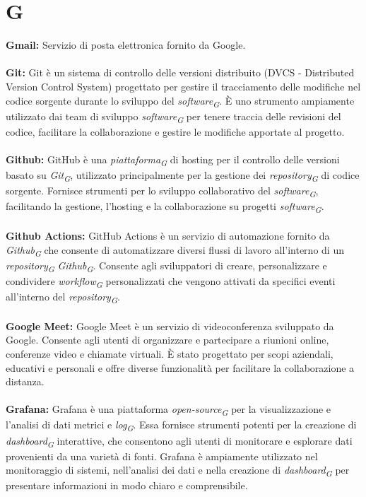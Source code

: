 \documentclass{article}
\begin{document}
\section*{G}
{}
\textbf{Gmail:} Servizio di posta elettronica fornito da Google.
\\
\\
\textbf{Git:} Git è un sistema di controllo delle versioni distribuito (DVCS - Distributed Version Control System) progettato per gestire il tracciamento delle modifiche nel codice sorgente durante lo sviluppo del \textit{software}\textsubscript{\textit{G}}. È uno strumento ampiamente utilizzato dai team di sviluppo \textit{software}\textsubscript{\textit{G}} per tenere traccia delle revisioni del codice, facilitare la collaborazione e gestire le modifiche apportate al progetto.
\\
\\
\textbf{Github:} GitHub è una \textit{piattaforma}\textsubscript{\textit{G}} di hosting per il controllo delle versioni basato su \textit{Git}\textsubscript{\textit{G}}, utilizzato principalmente per la gestione dei \textit{repository}\textsubscript{\textit{G}} di codice sorgente. Fornisce strumenti per lo sviluppo collaborativo del \textit{software}\textsubscript{\textit{G}}, facilitando la gestione, l'hosting e la collaborazione su progetti \textit{software}\textsubscript{\textit{G}}.
\\
\\
\textbf{Github Actions:} GitHub Actions è un servizio di automazione fornito da \textit{Github}\textsubscript{\textit{G}} che consente di automatizzare diversi flussi di lavoro all'interno di un \textit{repository}\textsubscript{\textit{G}} \textit{Github}\textsubscript{\textit{G}}. Consente agli sviluppatori di creare, personalizzare e condividere \textit{workflow}\textsubscript{\textit{G}} personalizzati che vengono attivati da specifici eventi all'interno del \textit{repository}\textsubscript{\textit{G}}.
\\
\\
\textbf{Google Meet:} Google Meet è un servizio di videoconferenza sviluppato da Google. Consente agli utenti di organizzare e partecipare a riunioni online, conferenze video e chiamate virtuali. È stato progettato per scopi aziendali, educativi e personali e offre diverse funzionalità per facilitare la collaborazione a distanza. 
\\
\\
\textbf{Grafana:} Grafana è una piattaforma \textit{open-source}\textsubscript{\textit{G}} per la visualizzazione e l'analisi di dati metrici e \textit{log}\textsubscript{\textit{G}}. Essa fornisce strumenti potenti per la creazione di \textit{dashboard}\textsubscript{\textit{G}} interattive, che consentono agli utenti di monitorare e esplorare dati provenienti da una varietà di fonti. Grafana è ampiamente utilizzato nel monitoraggio di sistemi, nell'analisi dei dati e nella creazione di \textit{dashboard}\textsubscript{\textit{G}} per presentare informazioni in modo chiaro e comprensibile.
\pagebreak
\end{document}
